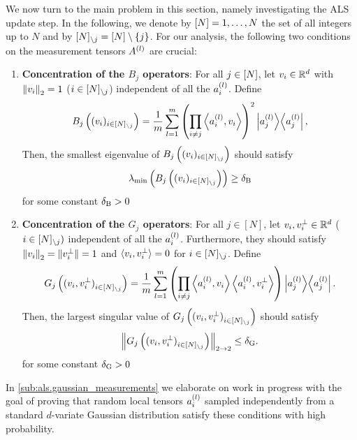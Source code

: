 We now turn to the main problem in this section, namely investigating the ALS update step.
In the following, we denote by $[N] = {1, \ldots, N}$ the set of all integers up to $N$ and by $[N]_{\setminus {j}} = [N] \setminus \{j\}$.
For our analysis, the following two conditions on the measurement tensors $A^{(l)}$ are crucial:
\begin{enumerate}
  \item\label{lbl:conditions.B}\textbf{Concentration of the $B_j$ operators}:
    For all $j \in [N]$, let $v_i \in {\mathbb{R}}^d$ with ${\Vert v_i\Vert}_2 = 1$ ($i \in [N]_{\setminus {j}}$) independent of all the $a^{(l)}_i$.
    Define
    \[
      \label{eq:ana.conditions.B}
      B_j\left((v_i)_{i \in [N]_{\setminus {j}}}\right)
      = \frac{1}{m} \sum_{l=1}^m \left( \prod_{i\neq j} \Braket{a^{(l)}_i, v_i} \right)^2 \left| a_j^{(l)} \middle\rangle\middle\langle a_j^{(l)} \right|,
    \]
    Then, the smallest eigenvalue of $B_j\left((v_i)_{i \in [N]_{\setminus {j}}}\right)$ should satisfy
    \[
      \label{eq:ana.conditions.lmin}
      \lambda_\mathrm{min}\left(B_j\left((v_i)_{i \in [N]_{\setminus {j}}}\right)\right) \ge \delta_\mathrm{B}
    \]
    for some constant $\delta_\mathrm{B} > 0$
  \item\label{lbl:conditions.G}\textbf{Concentration of the $G_j$ operators}:
    For all $j \in [N]$, let $v_i, v_i^\perp \in {\mathbb{R}}^d$ ($i \in [N]_{\setminus {j}})$ independent of all the $a^{(l)}_i$.
    Furthermore, they should satisfy ${\Vert v_i\Vert}_2 = {\Vert v_i^\perp\Vert}= 1$ and $\braket{v_i, v_i^\perp} = 0$ for $i\in[N]_{\setminus {j}}$.
    Define
    \[
      \label{eq:ana.conditions.G}
      G_j\left({(v_i, v_i^\perp)}_{i \in [N]_{\setminus {j}}} \right)
      = \frac{1}{m} \sum_{l=1}^m \left( \prod_{i\neq j} \Braket{a^{(l)}_i, v_i} \Braket{a^{(l)}_i, v_i^\perp} \right) \left| a_j^{(l)} \middle\rangle\middle\langle a_j^{(l)} \right|.
    \]
    Then, the largest singular value of $G_j\left({(v_i, v_i^\perp)}_{i \in [N]_{\setminus {j}}} \right)$ should satisfy
    \[
      \label{eq:ana.conditions.lmax}
      {\left\Vert G_j\left({(v_i, v_i^\perp)}_{i \in [N]_{\setminus {j}}} \right)\right\Vert}_{2 \to 2} \le \delta_\mathrm{G}.
    \]
    for some constant $\delta_\mathrm{G} > 0$
\end{enumerate}
In \cref{sub:als.gaussian_measurements} we elaborate on work in progress with the goal of proving that random local tensors $a^{(l)}_i$ sampled independently from a standard $d$-variate Gaussian distribution satisfy these conditions with high probability.\\


